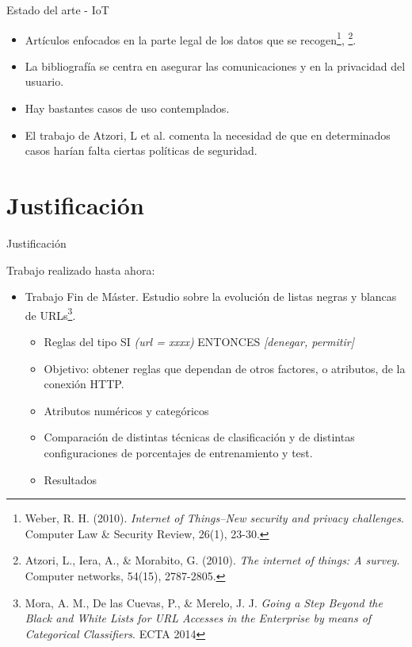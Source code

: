 \documentclass{beamer}
\begin{document}
\begin{frame}{Estado del arte - IoT}

\begin{itemize}
  \item Artículos enfocados en la parte legal de los datos que se recogen\footnote{Weber, R. H. (2010). \textit{Internet of Things–New security and privacy challenges}. Computer Law \& Security Review, 26(1), 23-30.}, \footnote{Atzori, L., Iera, A., \& Morabito, G. (2010). \textit{The internet of things: A survey}. Computer networks, 54(15), 2787-2805.}.
  \item La bibliografía se centra en asegurar las comunicaciones y en la privacidad del usuario.
  \item Hay bastantes casos de uso contemplados.
  \item El trabajo de Atzori, L et al. comenta la necesidad de que en determinados casos harían falta ciertas políticas de seguridad.
\end{itemize}

\end{frame}

\section{Justificación}

\begin{frame}{Justificación}

Trabajo realizado hasta ahora:

\begin{itemize}
  \item Trabajo Fin de Máster. Estudio sobre la evolución de listas negras y blancas de URLs\footnote{Mora, A. M., De las Cuevas, P., \& Merelo, J. J. \textit{Going a Step Beyond the Black and White Lists for URL Accesses in the Enterprise by means of Categorical Classifiers}. ECTA 2014}.
  \begin{itemize}
    \item Reglas del tipo SI \textit{(url = xxxx)} ENTONCES \textit{[denegar, permitir]}
    \item Objetivo: obtener reglas que dependan de otros factores, o atributos, de la conexión HTTP.
    \item Atributos numéricos y categóricos
    \item Comparación de distintas técnicas de clasificación y de distintas configuraciones de porcentajes de entrenamiento y test.
    \item Resultados
  \end{itemize}
\end{itemize}

\end{frame}
\end{document}
